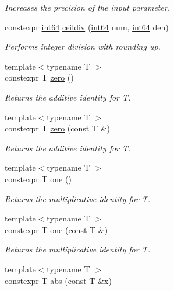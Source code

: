 \begin{DoxyCompactItemize}
\begin{DoxyCompactList}\small\item\em Increases the precision of the input parameter. \end{DoxyCompactList}\item 
constexpr \hyperlink{namespacegko_a6c57dbf3168b1ecad3ea133aaf2efbc1}{int64} \hyperlink{namespacegko_a93065a86872e6511b701b73b75823483}{ceildiv} (\hyperlink{namespacegko_a6c57dbf3168b1ecad3ea133aaf2efbc1}{int64} num, \hyperlink{namespacegko_a6c57dbf3168b1ecad3ea133aaf2efbc1}{int64} den)
\begin{DoxyCompactList}\small\item\em Performs integer division with rounding up. \end{DoxyCompactList}\item 
{\footnotesize template$<$typename T $>$ }\\constexpr T \hyperlink{namespacegko_a70dbe01ff95c7b953d3d737424c6feb5}{zero} ()
\begin{DoxyCompactList}\small\item\em Returns the additive identity for T. \end{DoxyCompactList}\item 
{\footnotesize template$<$typename T $>$ }\\constexpr T \hyperlink{namespacegko_a9f1cd7be946b9a2c15b01b744cf3e732}{zero} (const T \&)
\begin{DoxyCompactList}\small\item\em Returns the additive identity for T. \end{DoxyCompactList}\item 
{\footnotesize template$<$typename T $>$ }\\constexpr T \hyperlink{namespacegko_a0059e27f8f4bc348ff65c1e60caf47c8}{one} ()
\begin{DoxyCompactList}\small\item\em Returns the multiplicative identity for T. \end{DoxyCompactList}\item 
{\footnotesize template$<$typename T $>$ }\\constexpr T \hyperlink{namespacegko_ab4f16ecf0a759f46259cf9518f1e4568}{one} (const T \&)
\begin{DoxyCompactList}\small\item\em Returns the multiplicative identity for T. \end{DoxyCompactList}\item 
{\footnotesize template$<$typename T $>$ }\\constexpr T \hyperlink{namespacegko_a57797fc0a00fd4b7ff34ca4bfc84bc51}{abs} (const T \&x)

\end{DoxyCompactItemize}
